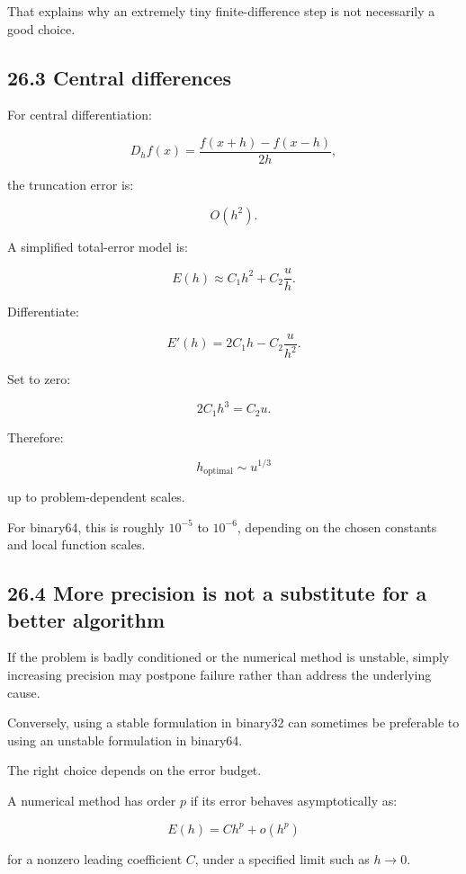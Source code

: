 That explains why an extremely tiny finite-difference step is not necessarily a good choice.

\subsection{26.3 Central differences}\label{02-foundations-ii-ch029-central-differences}

For central differentiation:

\[ D_hf(x)= \frac{f(x+h)-f(x-h)}{2h}, \]

the truncation error is:

\[ O(h^2). \]

A simplified total-error model is:

\[ \boxed{ E(h)\approx C_1h^2+C_2\frac uh }. \]

Differentiate:

\[ E'(h)=2C_1h-C_2\frac u{h^2}. \]

Set to zero:

\[ 2C_1h^3=C_2u. \]

Therefore:

\[ \boxed{ h_{\mathrm{optimal}}\sim u^{1/3} } \]

up to problem-dependent scales.

For binary64, this is roughly \(10^{-5}\) to \(10^{-6}\), depending on the chosen constants and local function scales.

\subsection{26.4 More precision is not a substitute for a better algorithm}\label{02-foundations-ii-ch029-more-precision-is-not-a-substitute-for-a-better-algorithm}

If the problem is badly conditioned or the numerical method is unstable, simply increasing precision may postpone failure rather than address the underlying cause.

Conversely, using a stable formulation in binary32 can sometimes be preferable to using an unstable formulation in binary64.

The right choice depends on the error budget.

A numerical method has order \(p\) if its error behaves asymptotically as:

\[ \boxed{ E(h)=Ch^p+o(h^p) } \]

for a nonzero leading coefficient \(C\), under a specified limit such as \(h\to0\).

